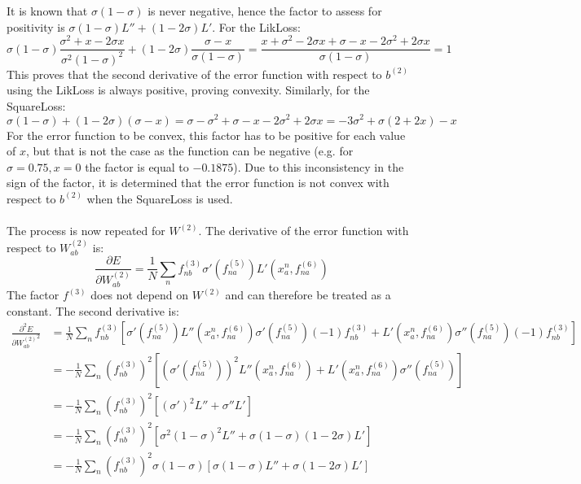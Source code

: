 \documentclass[fleqn]{report}
\begin{document}
It is known that $\sigma (1-\sigma)$ is never negative, hence the factor to assess for positivity is $\sigma(1-\sigma)L'' + (1-2\sigma)L'$. For the LikLoss:
\begin{equation}
    \sigma(1-\sigma)\frac{\sigma^2 + x -2\sigma x}{\sigma^2 (1-\sigma)^2} + (1-2\sigma)\frac{\sigma -x}{\sigma(1-\sigma)} = \frac{x + \sigma^2 -2\sigma x + \sigma -x -2\sigma^2 +2\sigma x}{\sigma(1-\sigma)} = 1
\end{equation}
This proves that the second derivative of the error function with respect to $b^{(2)}$ using the LikLoss is always positive, proving convexity. Similarly, for the SquareLoss:
\begin{equation}
        \sigma(1-\sigma) +(1-2\sigma)(\sigma-x) = \sigma - \sigma^2 + \sigma - x - 2\sigma^2 + 2\sigma x = -3\sigma^2 + \sigma(2+2x) - x
\end{equation}
For the error function to be convex, this factor has to be positive for each value of $x$, but that is not the case as the function can be negative (e.g. for $\sigma=0.75, x = 0$ the factor is equal to $-0.1875$). Due to this inconsistency in the sign of the factor, it is determined that the error function is not convex with respect to $b^{(2)}$ when the SquareLoss is used.\\ \ \\
The process is now repeated for $W^{(2)}$. The derivative of the error function with respect to $W^{(2)}_{ab}$ is:
\begin{equation}
    \frac{\partial E}{\partial W^{(2)}_{ab}} = \frac{1}{N} \sum_n f^{(3)}_{nb} \sigma'\left(f^{(5)}_{na}\right) L'\left(x^n_a, f^{(6)}_{na}\right)
\end{equation}
The factor $f^{(3)}$ does not depend on $W^{(2)}$ and can therefore be treated as a constant. The second derivative is:
\begin{equation}
    \begin{split}
        \frac{\partial ^2 E}{\partial {W^{(2)}_{ab}}^2} & = \frac{1}{N} \sum_n f^{(3)}_{nb} \left [
        \sigma'\left(f^{(5)}_{na}\right) L''\left(x^n_a, f^{(6)}_{na}\right) \sigma'\left(f^{(5)}_{na}\right) (-1) f^{(3)}_{nb} + L'\left(x^n_a, f^{(6)}_{na}\right) \sigma''\left(f^{(5)}_{na}\right) (-1) f^{(3)}_{nb}
        \right] \\
        & = - \frac{1}{N} \sum_n \left(f^{(3)}_{nb}\right)^2 \left [
        \left(\sigma'\left(f^{(5)}_{na}\right)\right)^2 L''\left(x^n_a, f^{(6)}_{na}\right) + L'\left(x^n_a, f^{(6)}_{na}\right) \sigma''\left(f^{(5)}_{na}\right)
        \right] \\
        & = - \frac{1}{N} \sum_n \left(f^{(3)}_{nb}\right)^2 \left[
        (\sigma ')^2 L'' + \sigma'' L' \right] \\
        & = - \frac{1}{N} \sum_n \left(f^{(3)}_{nb}\right)^2 \left[
        \sigma^2 (1-\sigma)^2 L'' + \sigma (1-\sigma)(1-2 \sigma) L' \right] \\
        & = - \frac{1}{N} \sum_n \left(f^{(3)}_{nb}\right)^2 \sigma (1-\sigma) \left[
        \sigma (1-\sigma) L'' + \sigma (1-2 \sigma) L' \right]
    \end{split}
\end{equation}
\end{document}
